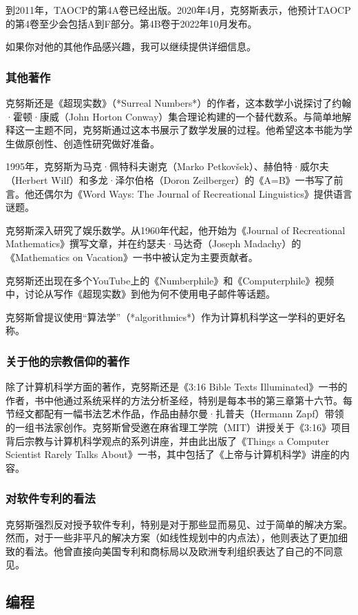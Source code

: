 到2011年，TAOCP的第4A卷已经出版。2020年4月，克努斯表示，他预计TAOCP的第4卷至少会包括A到F部分。第4B卷于2022年10月发布。

如果你对他的其他作品感兴趣，我可以继续提供详细信息。
\subsubsection{其他著作}
克努斯还是《超现实数》（*Surreal Numbers*）的作者，这本数学小说探讨了约翰·霍顿·康威（John Horton Conway）集合理论构建的一个替代数系。与简单地解释这一主题不同，克努斯通过这本书展示了数学发展的过程。他希望这本书能为学生做原创性、创造性研究做好准备。

1995年，克努斯为马克·佩特科夫谢克（Marko Petkovšek）、赫伯特·威尔夫（Herbert Wilf）和多龙·泽尔伯格（Doron Zeilberger）的《A=B》一书写了前言。他还偶尔为《Word Ways: The Journal of Recreational Linguistics》提供语言谜题。

克努斯深入研究了娱乐数学。从1960年代起，他开始为《Journal of Recreational Mathematics》撰写文章，并在约瑟夫·马达奇（Joseph Madachy）的《Mathematics on Vacation》一书中被认定为主要贡献者。

克努斯还出现在多个YouTube上的《Numberphile》和《Computerphile》视频中，讨论从写作《超现实数》到他为何不使用电子邮件等话题。

克努斯曾提议使用“算法学”（*algorithmics*）作为计算机科学这一学科的更好名称。
\subsubsection{关于他的宗教信仰的著作}
除了计算机科学方面的著作，克努斯还是《3:16 Bible Texts Illuminated》一书的作者，书中他通过系统采样的方法分析圣经，特别是每本书的第三章第十六节。每节经文都配有一幅书法艺术作品，作品由赫尔曼·扎普夫（Hermann Zapf）带领的一组书法家创作。克努斯曾受邀在麻省理工学院（MIT）讲授关于《3:16》项目背后宗教与计算机科学观点的系列讲座，并由此出版了《Things a Computer Scientist Rarely Talks About》一书，其中包括了《上帝与计算机科学》讲座的内容。
\subsubsection{对软件专利的看法}
克努斯强烈反对授予软件专利，特别是对于那些显而易见、过于简单的解决方案。然而，对于一些非平凡的解决方案（如线性规划中的内点法），他则表达了更加细致的看法。他曾直接向美国专利和商标局以及欧洲专利组织表达了自己的不同意见。
\subsection{编程}
